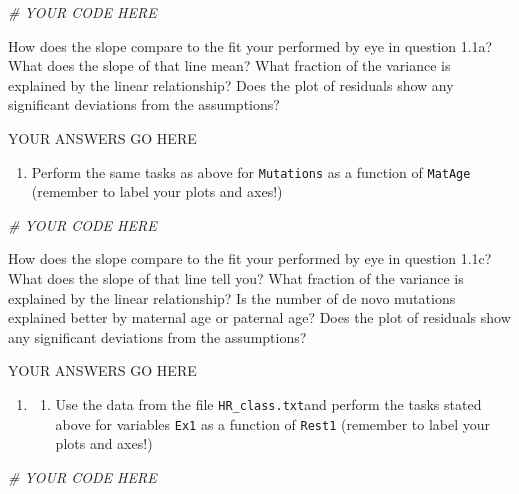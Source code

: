 \documentclass[
]{book}
\newenvironment{Shaded}{\begin{snugshade}}{\end{snugshade}}
\newcommand{\CommentTok}[1]{\textcolor[rgb]{0.56,0.35,0.01}{\textit{#1}}}
\providecommand{\tightlist}{%
  \setlength{\itemsep}{0pt}\setlength{\parskip}{0pt}}
\theoremstyle{definition}
\theoremstyle{definition}
\theoremstyle{definition}
\theoremstyle{remark}
\begin{document}
\begin{Shaded}
\begin{Highlighting}[]
\CommentTok{\# YOUR CODE HERE}
\end{Highlighting}
\end{Shaded}

How does the slope compare to the fit your performed by eye in question 1.1a? What does the slope of that line mean? What fraction of the variance is explained by the linear relationship? Does the plot of residuals show any significant deviations from the assumptions?

YOUR ANSWERS GO HERE

\begin{enumerate}
\def\labelenumi{\alph{enumi})}
\setcounter{enumi}{1}
\tightlist
\item
  Perform the same tasks as above for \texttt{Mutations} as a function of \texttt{MatAge} (remember to label your plots and axes!)
\end{enumerate}

\begin{Shaded}
\begin{Highlighting}[]
\CommentTok{\# YOUR CODE HERE}
\end{Highlighting}
\end{Shaded}

How does the slope compare to the fit your performed by eye in question 1.1c? What does the slope of that line tell you? What fraction of the variance is explained by the linear relationship? Is the number of de novo mutations explained better by maternal age or paternal age? Does the plot of residuals show any significant deviations from the assumptions?

YOUR ANSWERS GO HERE

\begin{enumerate}
\def\labelenumi{\arabic{enumi}.}
\setcounter{enumi}{1}
\item
  \begin{enumerate}
  \def\labelenumii{\alph{enumii})}
  \tightlist
  \item
    Use the data from the file \texttt{HR\_class.txt}and perform the tasks stated above for variables \texttt{Ex1} as a function of \texttt{Rest1} (remember to label your plots and axes!)
  \end{enumerate}
\end{enumerate}

\begin{Shaded}
\begin{Highlighting}[]
\CommentTok{\# YOUR CODE HERE}
\end{Highlighting}
\end{Shaded}
\end{document}
